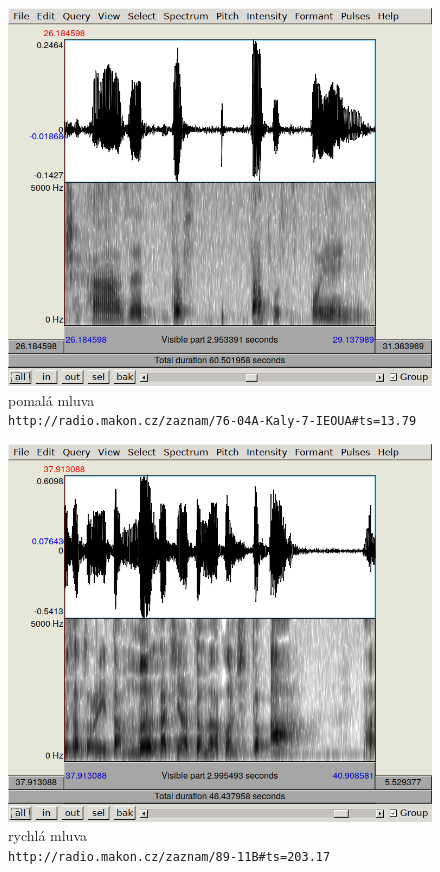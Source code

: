 \begin{figure}[htpb]
\includegraphics[scale=0.89]{rc/spectrum-pomala-mluva-76-04A.png}
\caption{
    pomalá mluva\\
    \texttt{http://radio.makon.cz/zaznam/76-04A-Kaly-7-IEOUA\#ts=13.79}
}
\label{fig:spectr-slowtalk}
\end{figure}

\begin{figure}[htpb]
\includegraphics[scale=0.89]{rc/spectrum-rychla-mluva-89-11B.png}
\caption{
    rychlá mluva\\
    \texttt{http://radio.makon.cz/zaznam/89-11B\#ts=203.17}
}
\label{fig:spectr-fasttalk}
\end{figure}

